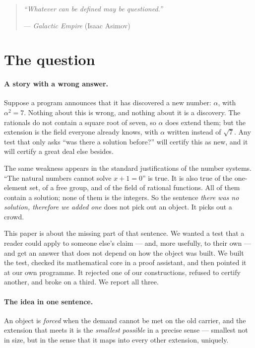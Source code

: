 \documentclass[aps,prd,preprint,superscriptaddress,amsmath,amssymb]{revtex4-2}
\begin{document}
\begin{quote}
\itshape
``Whatever can be defined may be questioned.''
\par
\vspace{0.4em}
--- \emph{Galactic Empire} (Isaac Asimov)
\end{quote}

\section{The question}
\label{sec:question}

\paragraph{A story with a wrong answer.}
Suppose a program announces that it has discovered a new number: $\alpha$, with
$\alpha^2=7$.  Nothing about this is wrong, and nothing about it is a discovery.
The rationals do not contain a square root of seven, so $\alpha$ does extend them;
but the extension is the field everyone already knows, with $\alpha$ written
instead of $\sqrt 7$.  Any test that only asks ``was there a solution before?''
will certify this as new, and it will certify a great deal else besides.

The same weakness appears in the standard justifications of the number systems.
``The natural numbers cannot solve $x+1=0$'' is true.  It is also true of the
one-element set, of a free group, and of the field of rational functions.  All of
them contain a solution; none of them is the integers.  So the sentence
\emph{there was no solution, therefore we added one} does not pick out an object.
It picks out a crowd.

This paper is about the missing part of that sentence.  We wanted a test that a
reader could apply to someone else's claim --- and, more usefully, to their own
--- and get an answer that does not depend on how the object was built.  We built
the test, checked its mathematical core in a proof assistant, and then pointed it
at our own programme.  It rejected one of our constructions, refused to certify
another, and broke on a third.  We report all three.

\paragraph{The idea in one sentence.}
An object is \emph{forced} when the demand cannot be met on the old carrier, and
the extension that meets it is the \emph{smallest possible} in a precise sense ---
smallest not in size, but in the sense that it maps into every other extension,
uniquely.
\end{document}

